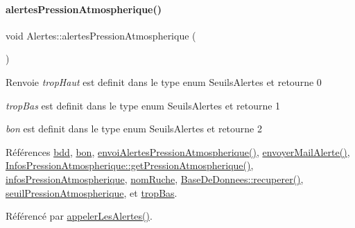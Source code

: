 \paragraph{\texorpdfstring{alertes\+Pression\+Atmospherique()}{alertesPressionAtmospherique()}}
{\footnotesize\ttfamily void Alertes\+::alertes\+Pression\+Atmospherique (\begin{DoxyParamCaption}{ }\end{DoxyParamCaption})}

\begin{DoxyReturn}{Renvoie}
{\itshape trop\+Haut} est definit dans le type enum Seuils\+Alertes et retourne 0 

{\itshape trop\+Bas} est definit dans le type enum Seuils\+Alertes et retourne 1 

{\itshape bon} est definit dans le type enum Seuils\+Alertes et retourne 2 
\end{DoxyReturn}


Références \hyperlink{class_alertes_a91e58b69d29922e8e984efb767ae5268}{bdd}, \hyperlink{parametres_8h_aaa6de8207c94675264c90b10b613368da5ac8ec3b54d90a07c6bb5a77ef971821}{bon}, \hyperlink{class_alertes_a3e81bcca9d4c91c69f575546681590bc}{envoi\+Alertes\+Pression\+Atmospherique()}, \hyperlink{class_alertes_a375783502a78109f3323dc1ed90cfdc9}{envoyer\+Mail\+Alerte()}, \hyperlink{class_infos_pression_atmospherique_ace9906ecdd245d4d443554fcc77c76a5}{Infos\+Pression\+Atmospherique\+::get\+Pression\+Atmospherique()}, \hyperlink{class_alertes_af4bfb245d72bc2eb080df844aa50ac86}{infos\+Pression\+Atmospherique}, \hyperlink{class_alertes_a212f2a7185bcc7b11f3e54200272bdcf}{nom\+Ruche}, \hyperlink{class_base_de_donnees_a77539baad389f5acf754cd2cd452403e}{Base\+De\+Donnees\+::recuperer()}, \hyperlink{class_alertes_a565094789ef5eb0ae2a2a562ee8a9704}{seuil\+Pression\+Atmospherique}, et \hyperlink{parametres_8h_aaa6de8207c94675264c90b10b613368da4257e2f8921856770c8266f55c937295}{trop\+Bas}.



Référencé par \hyperlink{class_alertes_ad04a02dcc6e6f14da0784c7054888b05}{appeler\+Les\+Alertes()}.


